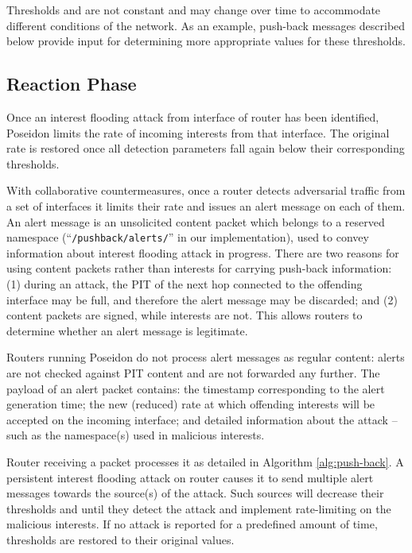 \documentclass[10pt,conference,letterpaper]{IEEEtran}
\newcommand{\ndnname}[1]{{\small \tt #1}}
\begin{document}
Thresholds  and  are not constant and may change over time to accommodate different conditions of the network. As an example, push-back messages described below provide input for determining more appropriate values for these thresholds.


\subsection{Reaction Phase}
\label{reaction-phase}

Once an interest flooding attack from interface   of router  has been identified, Poseidon limits the rate of incoming interests from that interface.
The original rate is restored once all detection parameters fall again below their corresponding thresholds.

With collaborative countermeasures, once a router detects adversarial traffic from a set of interfaces it limits their rate and issues an alert message on each of them.
An alert message is an unsolicited content packet which belongs to a reserved namespace (``\ndnname{/pushback/alerts/}'' in our implementation), used to convey information about interest flooding attack in progress. 
There are two reasons for using content packets rather than interests for carrying push-back information: (1) during an attack, the PIT of the next hop connected to the offending interface may be full, and therefore the alert message may be discarded; and (2) content packets are signed, while interests are not. This allows routers to determine whether an alert message is legitimate.

Routers running Poseidon do not process alert messages as regular content: alerts are not checked against PIT content and are not forwarded any further.
The payload of an alert packet contains: the timestamp corresponding to the alert generation time; the new (reduced) rate at which offending interests will be accepted on the incoming interface; and detailed information about the attack -- such as the namespace(s) used in malicious interests. 

Router  receiving a packet  processes it as detailed in Algorithm \ref{alg:push-back}.
A persistent interest flooding attack on router  causes it to send multiple alert messages towards the source(s) of the attack. Such sources will decrease their thresholds  and  until they detect the attack and implement rate-limiting on the malicious interests.
If no attack is reported for a predefined amount of time, thresholds are restored to their original values.
\end{document}
